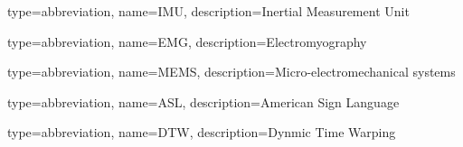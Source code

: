 
{
    type=abbreviation,
    name=IMU,
    description={Inertial Measurement Unit}
} 
 
 
{
    type=abbreviation,
    name=EMG,
    description={Electromyography}
}

{
    type=abbreviation,
    name=MEMS,
    description={Micro-electromechanical systems}
}

{
    type=abbreviation,
    name=ASL,
    description={American Sign Language}
}

{
    type=abbreviation,
    name=DTW,
    description={Dynmic Time Warping}
}